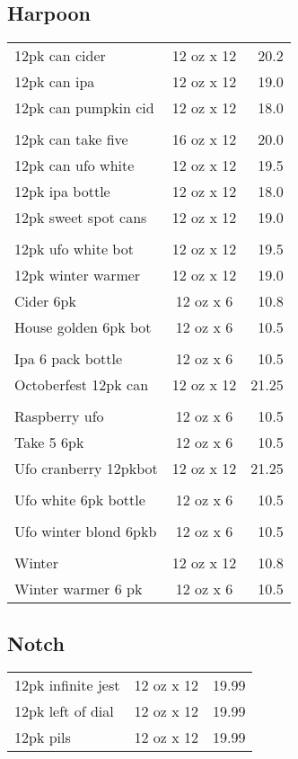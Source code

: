 \documentclass{article}%
\begin{document}
\begin{multicols}{3}
\subsection*{Harpoon}%
\begin{tabular}{>{\raggedright}p{16ex\hangindent=3ex} c r}%
12pk can cider&12 oz x 12&20.2\\%
12pk can ipa&12 oz x 12&19.0\\%
12pk can pumpkin cid&12 oz x 12&18.0\\%
&&\\%
12pk can take five&16 oz x 12&20.0\\%
12pk can ufo white&12 oz x 12&19.5\\%
12pk ipa bottle&12 oz x 12&18.0\\%
12pk sweet spot cans&12 oz x 12&19.0\\%
&&\\%
12pk ufo white bot&12 oz x 12&19.5\\%
12pk winter warmer&12 oz x 12&19.0\\%
Cider 6pk&12 oz x 6&10.8\\%
House golden 6pk bot&12 oz x 6&10.5\\%
&&\\%
Ipa 6 pack bottle&12 oz x 6&10.5\\%
Octoberfest 12pk can&12 oz x 12&21.25\\%
&&\\%
Raspberry ufo&12 oz x 6&10.5\\%
Take 5 6pk&12 oz x 6&10.5\\%
Ufo cranberry 12pkbot &12 oz x 12&21.25\\%
&&\\%
Ufo white 6pk bottle&12 oz x 6&10.5\\%
&&\\%
Ufo winter blond 6pkb&12 oz x 6&10.5\\%
&&\\%
Winter&12 oz x 12&10.8\\%
Winter warmer 6 pk&12 oz x 6&10.5\\%
\end{tabular}

%
\subsection*{Notch}%
\begin{tabular}{>{\raggedright}p{16ex\hangindent=3ex} c r}%
12pk infinite jest&12 oz x 12&19.99\\%
12pk left of dial&12 oz x 12&19.99\\%
12pk pils&12 oz x 12&19.99\\%
\end{tabular}


\end{multicols}
\end{document}
